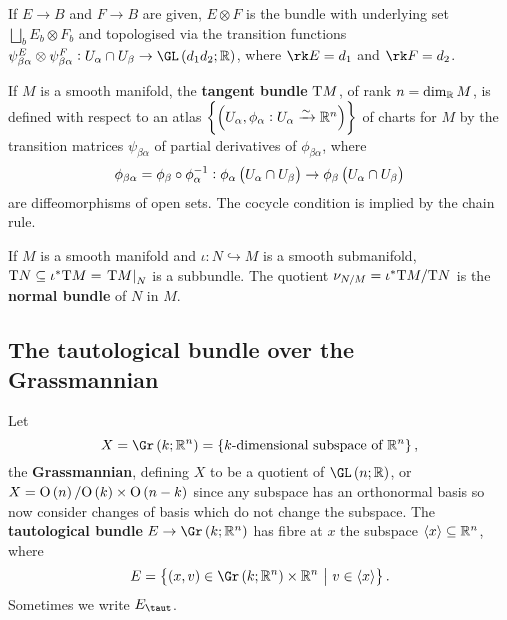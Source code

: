 \begin{example*}
If $ E \to B $ and $ F \to B $ are given, $ E \otimes F $ is the bundle with underlying set $ \bigsqcup_b E_b \otimes F_b $ and topologised via the transition functions $ \psi_{\beta\alpha}^E \otimes \psi_{\beta\alpha}^F : U_\alpha \cap U_\beta \to \GL\br{d_1d_2; \RR} $, where $ \rk E = d_1 $ and $ \rk F = d_2 $.
\end{example*}

\begin{example*}
If $ M $ is a smooth manifold, the \textbf{tangent bundle} $ \mathrm{T} M $, of rank $ n = \dim_{\mathbb{R}} M $, is defined with respect to an atlas $ \cbr{\br{U_\alpha, \phi_\alpha : U_\alpha \xrightarrow{\sim} \RR^n}} $ of charts for $ M $ by the transition matrices $ \psi_{\beta\alpha} $ of partial derivatives of $ \phi_{\beta\alpha} $, where
$$ \phi_{\beta\alpha} = \phi_\beta \circ \phi_\alpha^{-1} : \phi_\alpha\br{U_\alpha \cap U_\beta} \to \phi_\beta\br{U_\alpha \cap U_\beta} $$
are diffeomorphisms of open sets. The cocycle condition is implied by the chain rule.
\end{example*}

\begin{example*}
If $ M $ is a smooth manifold and $ \iota : N \hookrightarrow M $ is a smooth submanifold, $ \mathrm{T} N \subseteq \iota^*\mathrm{T} M = \left. \mathrm{T} M \right|_N $ is a subbundle. The quotient $ \nu_{N / M} = \iota^*\mathrm{T} M / \mathrm{T} N $ is the \textbf{normal bundle} of $ N $ in $ M $.
\end{example*}

\subsection{The tautological bundle over the Grassmannian}

\begin{example*}
Let
$$ X = \Gr\br{k; \RR^n} = \cbr{\text{$ k $-dimensional subspace of} \ \RR^n}, $$
the \textbf{Grassmannian}, defining $ X $ to be a quotient of $ \GL\br{n; \RR} $, or $ X = \O\br{n} / \O\br{k} \times \O\br{n - k} $ since any subspace has an orthonormal basis so now consider changes of basis which do not change the subspace. The \textbf{tautological bundle} $ E \to \Gr\br{k; \RR^n} $ has fibre at $ x $ the subspace $ \left\langle x \right\rangle \subseteq \mathbb{R}^n $, where
$$ E = \cbr{\br{x, v} \in \Gr\br{k; \RR^n} \times \RR^n \st v \in \abr{x}}. $$
Sometimes we write $ E_{\taut} $.
\end{example*}

\pagebreak

